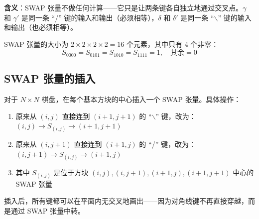 \documentclass[12pt,a4paper]{ctexart}
\begin{document}
\textbf{含义}：SWAP 张量不做任何计算——它只是让两条键各自独立地通过交叉点。$\gamma$ 和 $\gamma'$ 是同一条 ``/'' 键的输入和输出（必须相等），$\delta$ 和 $\delta'$ 是同一条 ``$\backslash$'' 键的输入和输出（也必须相等）。

SWAP 张量的大小为 $2 \times 2 \times 2 \times 2 = 16$ 个元素，其中只有 4 个非零：
\begin{equation}
S_{0000} = S_{0101} = S_{1010} = S_{1111} = 1, \quad \text{其余} = 0
\end{equation}

\begin{center}
\end{center}

\subsection{SWAP 张量的插入}

对于 $N \times N$ 棋盘，在每个基本方块的中心插入一个 SWAP 张量。具体操作：

\begin{enumerate}
\item 原来从 $(i,j)$ 直接连到 $(i+1,j+1)$ 的 ``$\backslash$'' 键，改为：$(i,j) \to S_{(i,j)} \to (i+1,j+1)$
\item 原来从 $(i,j+1)$ 直接连到 $(i+1,j)$ 的 ``/'' 键，改为：$(i,j+1) \to S_{(i,j)} \to (i+1,j)$
\item 其中 $S_{(i,j)}$ 是位于方块 $(i,j),(i,j+1),(i+1,j),(i+1,j+1)$ 中心的 SWAP 张量
\end{enumerate}

插入后，所有键都可以在平面内无交叉地画出——因为对角线键不再直接穿越，而是通过 SWAP 张量中转。
\end{document}
